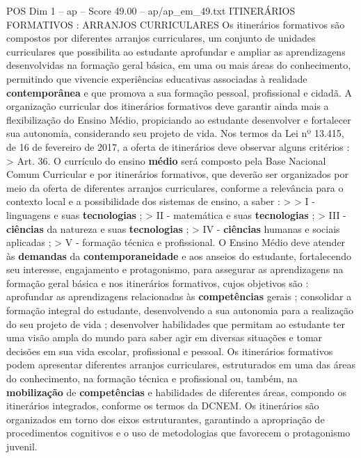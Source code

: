 \begin{textsample}{POS Dim 1 – ap – Score 49.00 – ap/ap\_em\_49.txt}  \label{ex:f1_pos_164}
ITINERÁRIOS FORMATIVOS : ARRANJOS CURRICULARES Os itinerários formativos são compostos por diferentes arranjos curriculares, um conjunto de unidades curriculares que possibilita ao estudante aprofundar e ampliar as aprendizagens desenvolvidas na formação geral básica, em uma ou mais áreas do conhecimento, permitindo que vivencie experiências educativas associadas à realidade \textbf{contemporânea} e que promova a sua formação pessoal, profissional e cidadã.
A organização curricular dos itinerários formativos deve garantir ainda mais a flexibilização do Ensino Médio, propiciando ao estudante desenvolver e fortalecer sua autonomia, considerando seu projeto de vida.
Nos termos da Lei nº 13.415, de 16 de fevereiro de 2017, a oferta de itinerários deve observar alguns critérios : > Art. 36.
O currículo do ensino \textbf{médio} será composto pela Base Nacional Comum Curricular e por itinerários formativos, que deverão ser organizados por meio da oferta de diferentes arranjos curriculares, conforme a relevância para o contexto local e a possibilidade dos sistemas de ensino, a saber : > > I - linguagens e suas \textbf{tecnologias} ; > II - matemática e suas \textbf{tecnologias} ; > III - \textbf{ciências} da natureza e suas \textbf{tecnologias} ; > IV - \textbf{ciências} humanas e sociais aplicadas ; > V - formação técnica e profissional.
O Ensino Médio deve atender às \textbf{demandas} da \textbf{contemporaneidade} e aos anseios do estudante, fortalecendo seu interesse, engajamento e protagonismo, para assegurar as aprendizagens na formação geral básica e nos itinerários formativos, cujos objetivos são : aprofundar as aprendizagens relacionadas às \textbf{competências} gerais ; consolidar a formação integral do estudante, desenvolvendo a sua autonomia para a realização do seu projeto de vida ; desenvolver habilidades que permitam ao estudante ter uma visão ampla do mundo para saber agir em diversas situações e tomar decisões em sua vida escolar, profissional e pessoal.
Os itinerários formativos podem apresentar diferentes arranjos curriculares, estruturados em uma das áreas do conhecimento, na formação técnica e profissional ou, também, na \textbf{mobilização} de \textbf{competências} e habilidades de diferentes áreas, compondo os itinerários integrados, conforme os termos da DCNEM.
Os itinerários são organizados em torno dos eixos estruturantes, garantindo a apropriação de procedimentos cognitivos e o uso de metodologias que favorecem o protagonismo juvenil.

\end{textsample}
